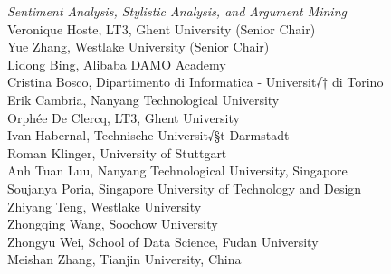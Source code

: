 \emph{Sentiment Analysis, Stylistic Analysis, and Argument Mining} \\
\hspace*{0.2in} Veronique Hoste, LT3, Ghent University (Senior Chair)\\
\hspace*{0.2in} Yue Zhang, Westlake University (Senior Chair)\\
\hspace*{0.2in} Lidong Bing, Alibaba DAMO Academy\\
\hspace*{0.2in} Cristina Bosco, Dipartimento di Informatica - Universit√† di Torino\\
\hspace*{0.2in} Erik Cambria, Nanyang Technological University\\
\hspace*{0.2in} Orph\'ee De Clercq, LT3, Ghent University\\
\hspace*{0.2in} Ivan Habernal, Technische Universit√§t Darmstadt\\
\hspace*{0.2in} Roman Klinger, University of Stuttgart\\
\hspace*{0.2in} Anh Tuan Luu, Nanyang Technological University, Singapore\\
\hspace*{0.2in} Soujanya Poria, Singapore University of Technology and Design\\
\hspace*{0.2in} Zhiyang Teng, Westlake University\\
\hspace*{0.2in} Zhongqing Wang, Soochow University\\
\hspace*{0.2in} Zhongyu Wei, School of Data Science, Fudan University\\
\hspace*{0.2in} Meishan Zhang, Tianjin University, China\\

